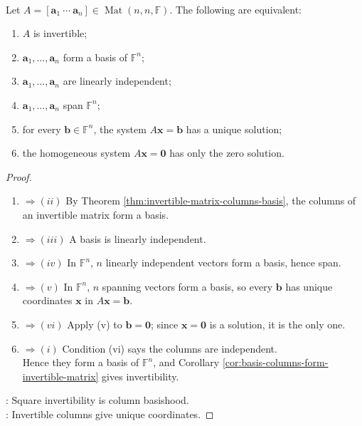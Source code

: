 \begin{corollary} \label{cor:square-matrix-algebraic-invertibility-dictionary} \\
Let $A=[\mathbf{a}_1\ \cdots\ \mathbf{a}_n]\in\operatorname{Mat}(n,n,\mathbb{F})$. The following are equivalent:
\begin{enumerate}[label=(\roman*)]
\setlength{\itemsep}{0pt}
\item $A$ is invertible;
\item $\mathbf{a}_1,\ldots,\mathbf{a}_n$ form a basis of $\mathbb{F}^n$;
\item $\mathbf{a}_1,\ldots,\mathbf{a}_n$ are linearly independent;
\item $\mathbf{a}_1,\ldots,\mathbf{a}_n$ span $\mathbb{F}^n$;
\item for every $\mathbf{b}\in\mathbb{F}^n$, the system $A\mathbf{x}=\mathbf{b}$ has a unique solution;
\item the homogeneous system $A\mathbf{x}=\mathbf{0}$ has only the zero solution.
\end{enumerate}
\begin{proof}
\begin{enumerate}[label=(\roman*).]
\setlength{\itemsep}{0pt}
\item[$(i)$]$\Rightarrow (ii)$ By Theorem \ref{thm:invertible-matrix-columns-basis}, the columns of an invertible matrix form a basis.
\item[$(ii)$]$\Rightarrow (iii)$ A basis is linearly independent.
\item[$(iii)$]$\Rightarrow (iv)$ In $\mathbb{F}^n$, $n$ linearly independent vectors form a basis, hence span.
\item[$(iv)$]$\Rightarrow (v)$ In $\mathbb{F}^n$, $n$ spanning vectors form a basis, so every $\mathbf{b}$ has unique coordinates $\mathbf{x}$ in $A\mathbf{x}=\mathbf{b}$.
\item[$(v)$]$\Rightarrow (vi)$ Apply (v) to $\mathbf{b}=\mathbf{0}$; since $\mathbf{x}=\mathbf{0}$ is a solution, it is the only one.
\item[$(vi)$]$\Rightarrow (i)$ Condition (vi) says the columns are independent.\\
Hence they form a basis of $\mathbb{F}^n$, and Corollary \ref{cor:basis-columns-form-invertible-matrix} gives invertibility.
\end{enumerate}
: Square invertibility is column basishood.\\
: Invertible columns give unique coordinates.
\end{proof}
\end{corollary}

